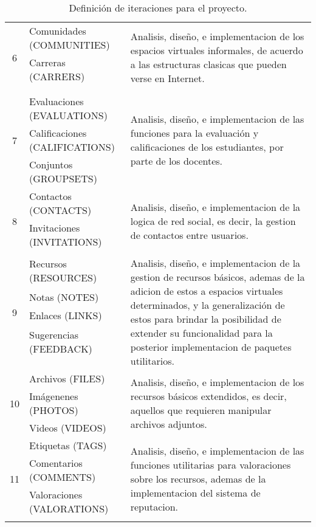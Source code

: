 \begin{table}
\begin{tabular}{|c|l|p{8.0cm}|}
\multirow{4}{*}{6} &
Comunidades (COMMUNITIES) &
\multirow{4}{8cm}{Analisis, diseño, e implementacion de los espacios virtuales
informales, de acuerdo a las estructuras clasicas que pueden verse en Internet.}
\\
 & Carreras (CARRERS) & \\
 & & \\
 & & \\
\hline

\multirow{3}{*}{7} &
Evaluaciones (EVALUATIONS) &
\multirow{3}{8cm}{Analisis, diseño, e implementacion de las funciones para la
evaluación y calificaciones de los estudiantes, por parte de los docentes.} \\
 & Calificaciones (CALIFICATIONS) & \\
 & Conjuntos (GROUPSETS) & \\
\hline

\multirow{3}{*}{8} &
Contactos (CONTACTS) &
\multirow{3}{8cm}{Analisis, diseño, e implementacion de la logica de red social,
es decir, la gestion de contactos entre usuarios.} \\
 & Invitaciones (INVITATIONS) & \\
 & & \\
\hline

\multirow{7}{*}{9} &
Recursos (RESOURCES) &
\multirow{7}{8cm}{Analisis, diseño, e implementacion de la gestion de recursos
básicos, ademas de la adicion de estos a espacios virtuales determinados, y la
generalización de estos para brindar la posibilidad de extender su funcionalidad
para la posterior implementacion de paquetes utilitarios.} \\
 & Notas (NOTES) & \\
 & Enlaces (LINKS) & \\
 & Sugerencias (FEEDBACK) & \\
 & & \\
 & & \\
 & & \\
\hline

\multirow{3}{*}{10} &
Archivos (FILES) &
\multirow{3}{8cm}{Analisis, diseño, e implementacion de los recursos básicos
extendidos, es decir, aquellos que requieren manipular archivos adjuntos.} \\
 & Imágenenes (PHOTOS) & \\
 & Videos (VIDEOS) & \\
\hline

\multirow{4}{*}{11} &
Etiquetas (TAGS) &
\multirow{4}{8cm}{Analisis, diseño, e implementacion de las funciones
utilitarias para valoraciones sobre los recursos, ademas de la implementacion
del sistema de reputacion.} \\
 & Comentarios (COMMENTS) & \\
 & Valoraciones (VALORATIONS) & \\
 & & \\
\hline
\end{tabular}
\caption{Definición de iteraciones para el proyecto.}
\label{iteraciones}
\end{table}

